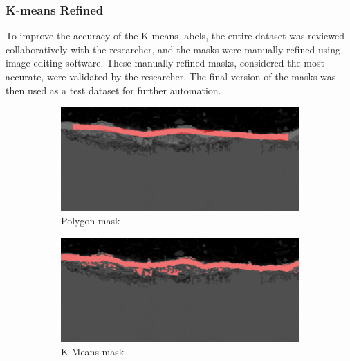 \subsubsection{K-means Refined}

To improve the accuracy of the K-means labels, the entire dataset was reviewed collaboratively with the researcher, and the masks were manually refined using image editing software. These manually refined masks, considered the most accurate, were validated by the researcher. The final version of the masks was then used as a test dataset for further automation.


\begin{figure}[ht]
    \centering
    \begin{subfigure}{0.3\textwidth}
        \centering
        \includegraphics[width=\linewidth]{PICTURES/MASK/POLYGON316L_W_3500h_low_cross_strana1_07.png}
        \caption{Polygon mask}
        \label{fig:polygon_sem_color}
    \end{subfigure}
    \hfill
    \begin{subfigure}{0.3\textwidth}
        \centering
        \includegraphics[width=\linewidth]{PICTURES/MASK/KMEAN316L_W_3500h_low_cross_strana1_07.png}
        \caption{K-Means mask}
        \label{fig:kmean_sem_color}
    \end{subfigure}
    \hfill
    \begin{subfigure}{0.3\textwidth}

\end{subfigure}
\end{figure}
